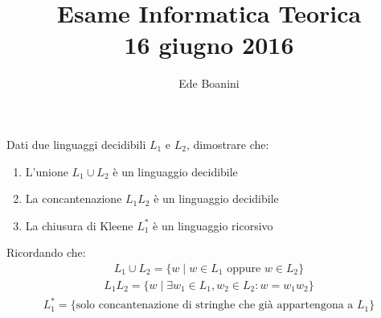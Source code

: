 \documentclass{article}  %
\title{Esame Informatica Teorica \\ 16 giugno 2016}
\author{Ede Boanini}
\date{}  %
\begin{document}
\maketitle
\begin{esercizio}[Esercizio 1]
Dati due linguaggi decidibili $L_1$ e $L_2$, dimostrare che:
\begin{enumerate}
    \item L'unione $L_1 \cup L_2$ è un linguaggio decidibile
    \item La concantenazione $L_1L_2$ è un linguaggio decidibile
    \item La chiusura di Kleene $L_1^*$ è un linguaggio ricorsivo
\end{enumerate}
Ricordando che:
\begin{align*}
    L_1 \cup L_2 = \{w \mid w \in L_1 \text{ oppure } w \in L_2\}
\end{align*}
\begin{align*}
    L_1L_2= \{w \mid \exists w_1 \in L_1, w_2 \in L_2 : w=w_1w_2\}
\end{align*}
\begin{align*}
    L_1^*= \{\text{solo concantenazione di stringhe che già appartengona a } L_1\}
\end{align*}





\end{esercizio}
\end{document}
